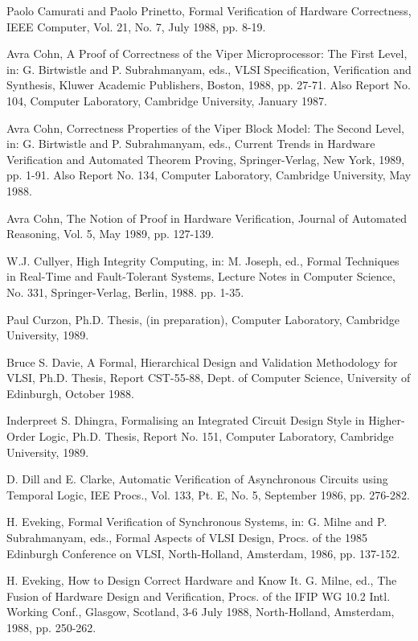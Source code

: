 \begin{thebibliography}{99}
Paolo Camurati and Paolo Prinetto,
Formal Verification of Hardware Correctness,
IEEE Computer, Vol. 21, No. 7, July 1988,
pp. 8-19.

Avra Cohn,
A Proof of Correctness of the Viper Microprocessor:  The First Level, in:
G. Birtwistle and P. Subrahmanyam, eds.,
VLSI Specification, Verification and Synthesis,
Kluwer Academic Publishers, Boston, 1988,
pp. 27-71.
Also Report No. 104, Computer Laboratory, Cambridge University,
January 1987.

Avra Cohn,
Correctness Properties of the Viper Block Model:  The Second Level, in:
G. Birtwistle and P. Subrahmanyam, eds.,
Current Trends in Hardware Verification and Automated Theorem Proving,
Springer-Verlag, New York, 1989,
pp. 1-91.
Also Report No. 134, Computer Laboratory, Cambridge University,
May 1988. 

Avra Cohn,
The Notion of Proof in Hardware Verification,
Journal of Automated Reasoning,
Vol. 5,
May 1989,
pp. 127-139.

W.J. Cullyer,
High Integrity Computing, in:
M. Joseph, ed.,
Formal Techniques in Real-Time and Fault-Tolerant Systems,
Lecture Notes in Computer Science, No. 331,
Springer-Verlag, Berlin, 1988.
pp. 1-35.

Paul Curzon,
Ph.D. Thesis,
(in preparation),
Computer Laboratory,
Cambridge University,
1989.

Bruce S. Davie,
A Formal, Hierarchical Design and Validation Methodology for VLSI,
Ph.D. Thesis,
Report CST-55-88,
Dept. of Computer Science,
University of Edinburgh,
October 1988.

Inderpreet S. Dhingra,
Formalising an Integrated Circuit Design Style in Higher-Order Logic,
Ph.D. Thesis,
Report No. 151,
Computer Laboratory,
Cambridge University,
1989.

D. Dill and E. Clarke,
Automatic Verification of Asynchronous Circuits using
Temporal Logic,
IEE Procs., Vol. 133, Pt. E, No. 5,
September 1986,
pp. 276-282.

H. Eveking,
Formal Verification of Synchronous Systems, in:
G. Milne and P. Subrahmanyam, eds.,
Formal Aspects of VLSI Design,
Procs. of the 1985 Edinburgh Conference on VLSI,
North-Holland, Amsterdam, 1986,
pp. 137-152.

H. Eveking,
How to Design Correct Hardware and Know It.
G. Milne, ed.,
The Fusion of Hardware Design and Verification,
Procs. of the IFIP WG 10.2 Intl. Working Conf.,
Glasgow, Scotland, 3-6 July 1988,
North-Holland, Amsterdam, 1988,
pp. 250-262.


\end{thebibliography}
